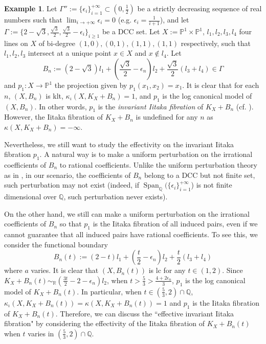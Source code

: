 \documentclass[11pt]{amsart}
\numberwithin{equation}{section}
\newcommand{\Qq}{\mathbb{Q}}
\newcommand{\Span}{\operatorname{Span}}
\newcommand{\Ii}{{\Gamma}}
\theoremstyle{definition}
\newtheorem{ex}[thm]{Example}
\theoremstyle{definition}
\begin{document}
\begin{ex}
Let $\Ii'':=\{\epsilon_i\}_{i=1}^{+\infty}\subset (0,\frac{1}{2})$ be a strictly decreasing sequence of real numbers such that $\lim_{i\rightarrow+\infty}\epsilon_i=0$ (e.g. $\epsilon_i=\frac{1}{i+1}$), and let $\Ii:=\{2-\sqrt{3},\frac{\sqrt{3}}{2},\frac{\sqrt{3}}{2}-\epsilon_i\}_{i\ge1}$ be a DCC set. Let $X:=\mathbb P^1\times\mathbb P^1$, $l_1,l_2,l_3,l_4$ four lines on $X$ of bi-degree $(1,0),(0,1),(1,1),(1,1)$ respectively, such that $l_1,l_2,l_3$ intersect at a unique point $x\in X$ and $x\notin l_4$. Let
$$B_n:=(2-\sqrt{3})l_1+(\frac{\sqrt{3}}{2}-\epsilon_n)l_2+\frac{\sqrt{3}}{2}(l_3+l_4)\in\Ii$$
and $p_1: X\rightarrow\mathbb P^1$ the projection given by $p_1(x_1,x_2)=x_1$. It is clear that for each $n$, $(X,B_n)$ is klt, $\kappa_{\iota}(X,K_X+B_n)=1$, and $p_1$ is the log canonical model of $(X,B_n)$. In other words,  $p_1$ is the \emph{invariant Iitaka fibration} of $K_X+B_n$ (cf. \cite[Definition 2.2]{Hu20}). However, the Iitaka fibration of $K_X+B_n$ is undefined for any $n$ as $\kappa(X,K_X+B_n)=-\infty$.

Nevertheless, we still want to study the effectivity on the invariant Iitaka fibration $p_1$. A natural way is to make a uniform perturbation on the irrational coefficients of $B_n$ to rational coefficients. Unlike the uniform perturbation theory as in \cite{HLS19}, in our scenario, the coefficients of $B_n$ belong to a DCC but not finite set, such perturbation may not exist (indeed, if $\Span_{\mathbb Q}(\{\epsilon_i\}_{i=1}^{+\infty}$) is not finite dimensional over $\Qq$, such perturbation never exists).

On the other hand, we still can make a uniform perturbation on the irrational coefficients of $B_n$ so that $p_1$ is the Iitaka fibration of all induced pairs, even if we cannot guarantee that all induced pairs have rational coefficients. To see this, we consider the functional boundary
$$B_n(t):=(2-t)l_1+(\frac{t}{2}-\epsilon_n)l_2+\frac{t}{2}(l_3+l_4)$$
where $a$ varies. It is clear that $(X,B_n(t))$ is lc for any $t\in (1,2)$. Since $K_X+B_n(t)\sim_{\mathbb R}(\frac{3t}{2}-2-\epsilon_n)l_2$, when $t>\frac{5}{3}>\frac{4+2\epsilon_n}{3}$, $p_1$ is the log canonical model of $K_X+B_n(t)$. In particular, when $t\in (\frac{5}{3},2)\cap\mathbb Q$, $\kappa_{\iota}(X,K_X+B_n(t))=\kappa(X,K_X+B_n(t))=1$ and $p_1$ is the Iitaka fibration of $K_X+B_n(t)$. Therefore, we can discuss the ``effective invariant Iitaka fibration" by considering the effectivity of the Iitaka fibration of $K_X+B_n(t)$ when $t$ varies in $(\frac{5}{3},2)\cap\mathbb Q$.


\end{ex}
\end{document}
